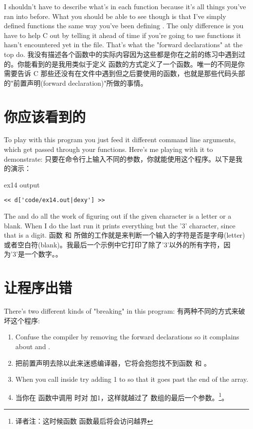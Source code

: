 I shouldn't have to describe what's in each function because it's all
things you've ran into before.  What you should be able to see though
is that I've simply defined functions the same way you've been defining
.  The only difference is you have to help C out by telling
it ahead of time if you're going to use functions it hasn't encountered
yet in the file.  That's what the "forward declarations" at the top do.
我没有描述各个函数中的实际内容因为这些都是你在之前的练习中遇到过的。你能看到的是我用类似于定义  函数的方式定义了一个函数。唯一的不同是你需要告诉 C 那些还没有在文件中遇到但之后要使用的函数，也就是那些代码头部的"前置声明(forward declaration)"所做的事情。

\section{你应该看到的}

To play with this program you just feed it different command line 
arguments, which get passed through your functions.  Here's me
playing with it to demonstrate:
只要在命令行上输入不同的参数，你就能使用这个程序。以下是我的演示：
\begin{code}{ex14 output}
\begin{lstlisting}
<< d['code/ex14.out|dexy'] >>
\end{lstlisting}
\end{code}

The  and  do all the work of figuring
out if the given character is a letter or a blank.  When I do the
last run it prints everything but the '3' character, since that 
is a digit.
函数  和  所做的工作就是来判断一个输入的字符是否是字母(letter)或者空白符(blank)。我最后一个示例中它打印了除了'3'以外的所有字符，因为'3'是一个数字。。
\section{让程序出错}

There's two different kinds of "breaking" in this program:
有两种不同的方式来破坏这个程序:
\begin{enumerate}
\item Confuse the compiler by removing the forward declarations
    so it complains about  and .
\item 把前置声明去除以此来迷惑编译器，它将会抱怨找不到函数  和 。
\item When you call  inside  try
    adding 1 to  so that it goes past the end of the
     array.
\item 当你在  函数中调用  时对  加1，这样就越过了  数组的最后一个参数。\footnote{译者注：这时候函数  函数最后将会访问越界}。
\end{enumerate}


